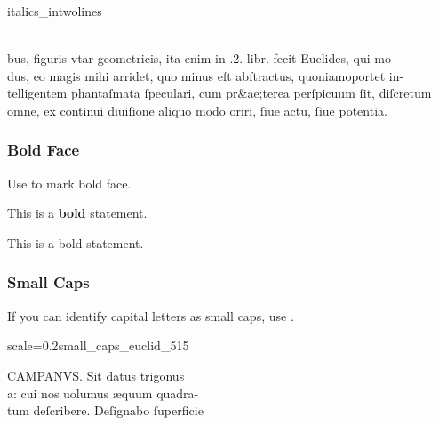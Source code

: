 \begin{sampleImage}{italics_intwolines}
\begin{typeLatin}
 \someText\\
bus, figuris vtar geometricis, ita enim in .2. libr. fecit Euclides, qui mo- \\
dus, eo magis mihi arridet, quo minus eſt abſtractus, quoniam\lwr oportet in- \\
telligentem phantaſmata ſpeculari, cum pr&ae;terea perſpicuum ſit, diſcretum \\
omne, ex continui diuiſione aliquo modo oriri, ſiue actu, ſiue potentia. \\
\someText {}
\end{typeLatin}
\end{sampleImage}


\subsubsection{Bold Face}
\label{section bold face}

\begin{mainruleLessImportant}
Use  to mark bold face.
\end{mainruleLessImportant}

\begin{example}

\vspace{-4mm}
This is a \textbf{bold}  statement.

\begin{typeLatin}
This is a bold statement.
\end{typeLatin}
\end{example}

\subsubsection{Small Caps}
\label{section small caps}

\begin{mainrule}
If you can identify capital letters as small caps, use .
\end{mainrule}

\vspace{3mm}
\begin{sampleImageSmall}{scale=0.2}{small_caps_euclid_515}

\begin{typeLatin}
CAMPANVS. Sit datus trigonus \\
a: cui nos uolumus æquum quadra- \\
tum deſcribere. Deſignabo ſuperfici\bs\tld{}e  \\
\someText {}
\end{typeLatin}

\end{sampleImageSmall}

